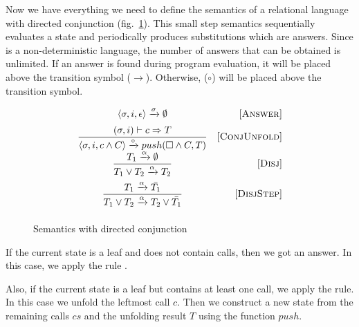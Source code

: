
Now we have everything we need to define the semantics of a relational language with directed conjunction (fig.~\ref{fair:classic-semantics}). This small step semantics sequentially evaluates a state and periodically produces substitutions which are answers. Since \mk is a non-deterministic language, the number of answers that can be obtained is unlimited. If an answer is found during program evaluation, it will be placed above the transition symbol ($\xrightarrow{}$). Otherwise, ($\circ$) will be placed above the transition symbol.

\begin{figure}[h!]
\[\begin{array}{cr}

      {\langle \sigma, i, \epsilon \rangle \xrightarrow{\sigma} \emptyset}  
&     \mbox{[\textsc{Answer}]} \\[2mm]
\dfrac{(\sigma, i) \vdash c \Rightarrow T}
      {\langle \sigma, i, c \land C \rangle \xrightarrow{\circ} push(\Box \land C, T)}
&     \mbox{[\textsc{ConjUnfold}]} \\[2mm]
\dfrac{T_1 \xrightarrow{\alpha} \emptyset}
      {T_1 \lor T_2 \xrightarrow{\alpha} T_2}
&     \mbox{[\textsc{Disj}]} \\[4mm]
\dfrac{T_1 \xrightarrow{\alpha} \bar{T_1}}
      {T_1 \lor T_2 \xrightarrow{\alpha} T_2 \lor\bar{T_1}}
&     \mbox{[\textsc{DisjStep}]} \\[4mm]
\end{array}\]
\caption{Semantics with directed conjunction}
\label{fair:classic-semantics}
\end{figure}

If the current state is a leaf and does not contain calls, then we got an answer. In this case, we apply the rule .

Also, if the current state is a leaf but contains at least one call, we apply the  rule. In this case we unfold the leftmost call $c$. Then we construct a new state from the remaining calls $cs$ and the unfolding result $T$ using the function $push$.

